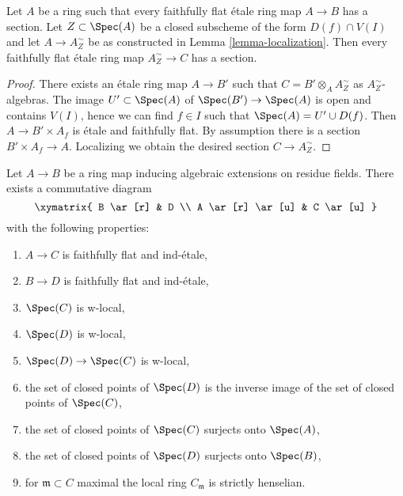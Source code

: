 \begin{lemma}
\label{lemma-have-sections-localize}
Let $A$ be a ring such that every faithfully flat \'etale ring map
$A \to B$ has a section. Let $Z \subset \Spec(A)$ be a closed subscheme
of the form $D(f) \cap V(I)$ and let $A \to A_Z^\sim$ be as constructed
in Lemma \ref{lemma-localization}.
Then every faithfully flat \'etale ring map $A_Z^\sim \to C$ has
a section.
\end{lemma}

\begin{proof}
There exists an \'etale ring map $A \to B'$ such that
$C = B' \otimes_A A_Z^\sim$ as $A_Z^\sim$-algebras.
The image $U' \subset \Spec(A)$ of $\Spec(B') \to \Spec(A)$
is open and contains $V(I)$, hence we can find $f \in I$ such
that $\Spec(A) = U' \cup D(f)$. Then $A \to B' \times A_f$
is \'etale and faithfully flat. By assumption there is a section
$B' \times A_f \to A$. Localizing we obtain the desired section
$C \to A_Z^\sim$.
\end{proof}

\begin{lemma}
\label{lemma-get-w-local-algebraic-residue-field-extensions}
Let $A \to B$ be a ring map inducing algebraic extensions on residue fields.
There exists a commutative diagram
$$
\xymatrix{
B \ar[r] & D \\
A \ar[r] \ar[u] & C \ar[u]
}
$$
with the following properties:
\begin{enumerate}
\item $A \to C$ is faithfully flat and ind-\'etale,
\item $B \to D$ is faithfully flat and ind-\'etale,
\item $\Spec(C)$ is w-local,
\item $\Spec(D)$ is w-local,
\item $\Spec(D) \to \Spec(C)$ is w-local,
\item the set of closed points of $\Spec(D)$ is the inverse image
of the set of closed points of $\Spec(C)$,
\item the set of closed points of $\Spec(C)$ surjects onto $\Spec(A)$,
\item the set of closed points of $\Spec(D)$ surjects onto $\Spec(B)$,
\item for $\mathfrak m \subset C$ maximal the local ring
$C_\mathfrak m$ is strictly henselian.
\end{enumerate}
\end{lemma}

